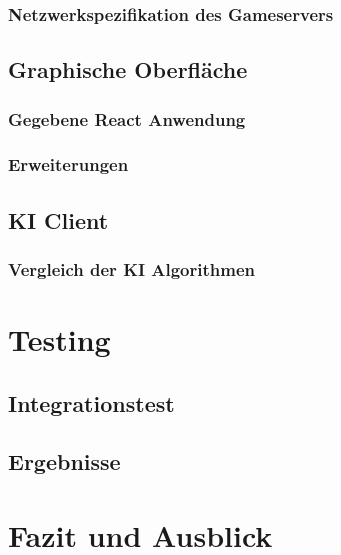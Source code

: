 \documentclass[12pt,a4paper,bibliography=totocnumbered,listof=totocnumbered]{article}
\begin{document}
\subsubsection{Netzwerkspezifikation des Gameservers}
\subsection{Graphische Oberfläche}
\subsubsection{Gegebene React Anwendung}
\subsubsection{Erweiterungen}
\subsection{KI Client}
\subsubsection{Vergleich der KI Algorithmen}

\section{Testing}
\subsection{Integrationstest}
\subsection{Ergebnisse}

\pagebreak
\section{Fazit und Ausblick}
\end{document}
